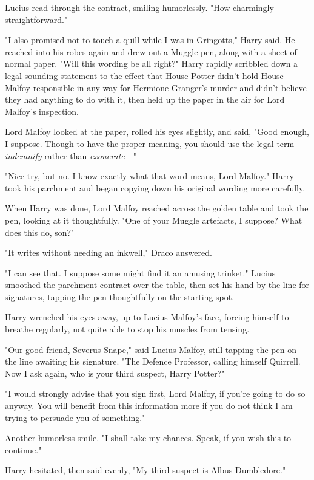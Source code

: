 Lucius read through the contract, smiling humorlessly. "How charmingly
straightforward."

"I also promised not to touch a quill while I was in Gringotts," Harry said. He
reached into his robes again and drew out a Muggle pen, along with a sheet of
normal paper. "Will this wording be all right?" Harry rapidly scribbled down a
legal-sounding statement to the effect that House Potter didn't hold House
Malfoy responsible in any way for Hermione Granger's murder and didn't believe
they had anything to do with it, then held up the paper in the air for Lord
Malfoy's inspection.

Lord Malfoy looked at the paper, rolled his eyes slightly, and said, "Good
enough, I suppose. Though to have the proper meaning, you should use the legal
term \emph{indemnify} rather than \emph{exonerate}---"

"Nice try, but no. I know exactly what that word means, Lord Malfoy." Harry
took his parchment and began copying down his original wording more carefully.

When Harry was done, Lord Malfoy reached across the golden table and took the
pen, looking at it thoughtfully. "One of your Muggle artefacts, I suppose? What
does this do, son?"

"It writes without needing an inkwell," Draco answered.

"I can see that. I suppose some might find it an amusing trinket." Lucius
smoothed the parchment contract over the table, then set his hand by the line
for signatures, tapping the pen thoughtfully on the starting spot.

Harry wrenched his eyes away, up to Lucius Malfoy's face, forcing himself to
breathe regularly, not quite able to stop his muscles from tensing.

"Our good friend, Severus Snape," said Lucius Malfoy, still tapping the pen on
the line awaiting his signature. "The Defence Professor, calling himself
Quirrell. Now I ask again, who is your third suspect, Harry Potter?"

"I would strongly advise that you sign first, Lord Malfoy, if you're going to
do so anyway. You will benefit from this information more if you do not think I
am trying to persuade you of something."

Another humorless smile. "I shall take my chances. Speak, if you wish this to
continue."

Harry hesitated, then said evenly, "My third suspect is Albus Dumbledore."

